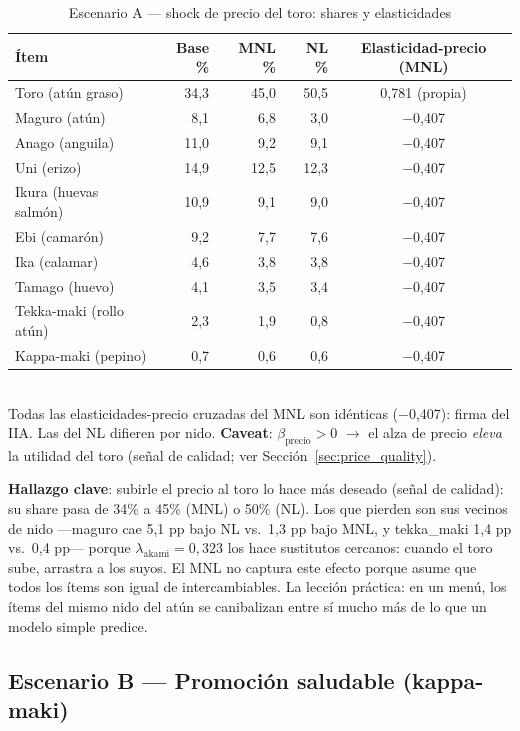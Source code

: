 \documentclass[12pt,a4paper]{article}
\begin{document}
\begin{table}[H]
  \centering
  \small
  \caption{Escenario A --- shock de precio del toro: shares y elasticidades}
  \label{tab:scenarioA}
  \begin{tabular}{lrrrc}
    \toprule
    Ítem & Base \% & MNL \% & NL \% & Elasticidad-precio (MNL) \\
    \midrule
    Toro (atún graso)      & 34,3 & 45,0 & 50,5 & 0,781 (propia) \\
    Maguro (atún)          &  8,1 &  6,8 &  3,0 & $-$0,407 \\
    Anago (anguila)        & 11,0 &  9,2 &  9,1 & $-$0,407 \\
    Uni (erizo)            & 14,9 & 12,5 & 12,3 & $-$0,407 \\
    Ikura (huevas salmón)  & 10,9 &  9,1 &  9,0 & $-$0,407 \\
    Ebi (camarón)          &  9,2 &  7,7 &  7,6 & $-$0,407 \\
    Ika (calamar)          &  4,6 &  3,8 &  3,8 & $-$0,407 \\
    Tamago (huevo)         &  4,1 &  3,5 &  3,4 & $-$0,407 \\
    Tekka-maki (rollo atún)&  2,3 &  1,9 &  0,8 & $-$0,407 \\
    Kappa-maki (pepino)    &  0,7 &  0,6 &  0,6 & $-$0,407 \\
    \bottomrule
  \end{tabular}
  \\[4pt]
  {\footnotesize Todas las elasticidades-precio cruzadas del MNL son idénticas ($-$0,407): firma del IIA. Las del NL difieren por nido. \textbf{Caveat}: $\beta_{\text{precio}} > 0$ $\rightarrow$ el alza de precio \emph{eleva} la utilidad del toro (señal de calidad; ver Sección~\ref{sec:price_quality}).}
\end{table}

\textbf{Hallazgo clave}: subirle el precio al toro lo hace más deseado (señal de calidad): su share pasa de 34\% a 45\% (MNL) o 50\% (NL). Los que pierden son sus vecinos de nido ---maguro cae 5,1 pp bajo NL vs.\ 1,3 pp bajo MNL, y tekka\_maki 1,4 pp vs.\ 0,4 pp--- porque $\lambda_{\text{akami}} = 0{,}323$ los hace sustitutos cercanos: cuando el toro sube, arrastra a los suyos. El MNL no captura este efecto porque asume que todos los ítems son igual de intercambiables. La lección práctica: en un menú, los ítems del mismo nido del atún se canibalizan entre sí mucho más de lo que un modelo simple predice.

\subsection{Escenario B --- Promoción saludable (kappa-maki)}
\end{document}

